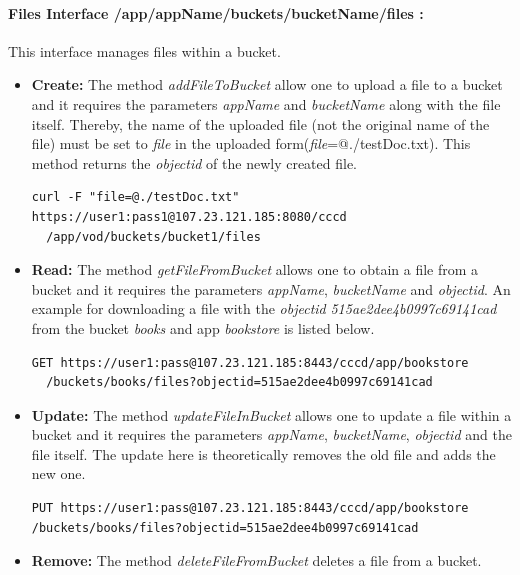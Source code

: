 \paragraph{Files Interface /app/{appName}/buckets/{bucketName}/files :}  This interface manages files within a bucket.

\begin{itemize}
\item {\textbf{Create:}} The method \textit{addFileToBucket} allow one to upload a file to a bucket and it requires the parameters \textit{appName} and \textit{bucketName} along with the file itself. Thereby, the name of the uploaded file (not the original name of the file) must be set to \textit{file} in the uploaded form(\textit{file}=@./testDoc.txt). This method returns the \textit{objectid} of the newly created file.

\begin{code}
\begin{verbatim}
curl -F "file=@./testDoc.txt" https://user1:pass1@107.23.121.185:8080/cccd
  /app/vod/buckets/bucket1/files
\end{verbatim}
\end{code}

\item {\textbf{Read:}} The method \textit{getFileFromBucket} allows one to obtain a file from a bucket and it requires the parameters \textit{appName}, \textit{bucketName} and \textit{objectid}.  An example for downloading a file with the \textit{objectid}  \textit{515ae2dee4b0997c69141cad} from the bucket \textit{books} and app \textit{bookstore} is listed below.

\begin{code}
\begin{verbatim}
GET https://user1:pass@107.23.121.185:8443/cccd/app/bookstore
  /buckets/books/files?objectid=515ae2dee4b0997c69141cad
\end{verbatim}
\end{code}

\item {\textbf{Update:}} The method \textit{updateFileInBucket} allows one to update a file within a bucket and it requires the parameters \textit{appName}, \textit{bucketName}, \textit{objectid} and the file itself.  The update here is theoretically removes the old file and  adds the new one.
\begin{code}
\begin{verbatim}
PUT https://user1:pass@107.23.121.185:8443/cccd/app/bookstore
/buckets/books/files?objectid=515ae2dee4b0997c69141cad
\end{verbatim}
\end{code}

\item {\textbf{Remove:}} The method \textit{deleteFileFromBucket} deletes a file from a bucket.

\end{itemize}

